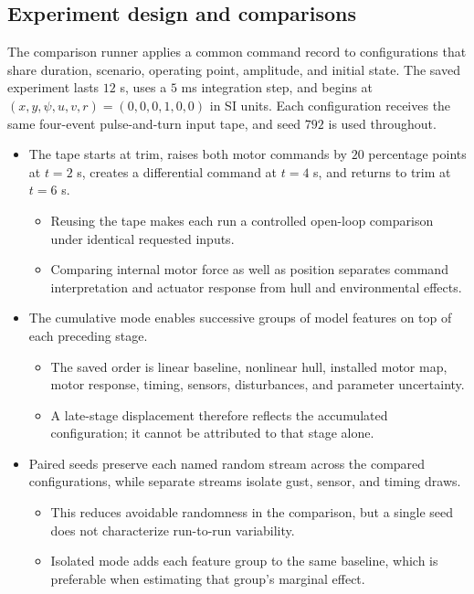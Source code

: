 \documentclass[10pt,letterpaper]{article}
\begin{document}
\subsection{Experiment design and comparisons}

The comparison runner applies a common command record to configurations that share duration, scenario, operating point, amplitude, and initial state. The saved experiment lasts \(12\) s, uses a \(5\) ms integration step, and begins at \((x,y,\psi,u,v,r) = (0,0,0,1,0,0)\) in SI units. Each configuration receives the same four-event pulse-and-turn input tape, and seed \(792\) is used throughout.

\begin{itemize}
\item
  The tape starts at trim, raises both motor commands by \(20\) percentage points at \(t = 2\) s, creates a differential command at \(t = 4\) s, and returns to trim at \(t = 6\) s.

  \begin{itemize}
  \item
    Reusing the tape makes each run a controlled open-loop comparison under identical requested inputs.
  \item
    Comparing internal motor force as well as position separates command interpretation and actuator response from hull and environmental effects.
  \end{itemize}
\item
  The cumulative mode enables successive groups of model features on top of each preceding stage.

  \begin{itemize}
  \item
    The saved order is linear baseline, nonlinear hull, installed motor map, motor response, timing, sensors, disturbances, and parameter uncertainty.
  \item
    A late-stage displacement therefore reflects the accumulated configuration; it cannot be attributed to that stage alone.
  \end{itemize}
\item
  Paired seeds preserve each named random stream across the compared configurations, while separate streams isolate gust, sensor, and timing draws.

  \begin{itemize}
  \item
    This reduces avoidable randomness in the comparison, but a single seed does not characterize run-to-run variability.
  \item
    Isolated mode adds each feature group to the same baseline, which is preferable when estimating that group's marginal effect.
  \end{itemize}
\end{itemize}
\end{document}
